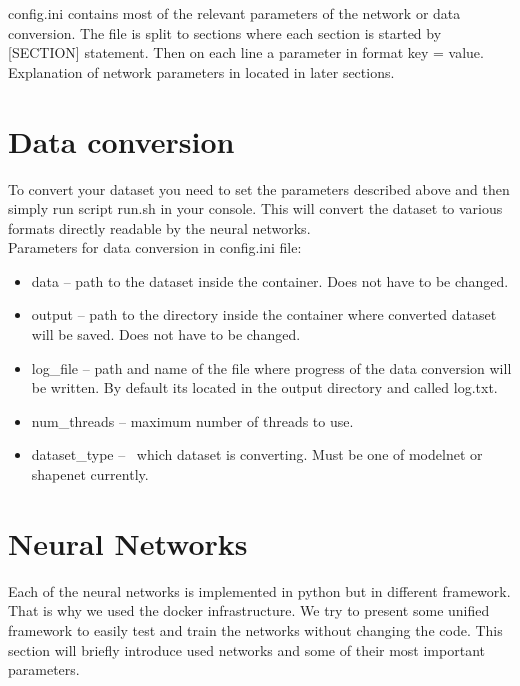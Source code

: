 config.ini contains most of the relevant parameters of the network or data conversion. The file is split to sections where each section is started by [SECTION] statement. Then on each line a parameter in format key = value. Explanation of network parameters in located in later sections.

\section{Data conversion}
To convert your dataset you need to set the parameters described above and then simply run script run.sh in your console. This will convert the dataset to various formats directly readable by the neural networks.\\
Parameters for data conversion in config.ini file:
\begin{itemize}
	\item  {data -- path to the dataset inside the container. Does not have to be changed.}
	\item{output -- path to the directory inside the container where converted dataset will be saved. Does not have to be changed.}
	\item{log\_file -- path and name of the file where progress of the data conversion will be written. By default its located in the output directory and called log.txt.}
	\item{num\_threads -- maximum number of threads to use.}
	\item{dataset\_type --  which dataset is converting. Must be one of modelnet or shapenet currently.}
\end{itemize}

\section{Neural Networks}
Each of the neural networks is implemented in python but in different framework. That is why we used the docker infrastructure. We try to present some unified framework to easily test and train the networks without changing the code. This section will briefly introduce used networks and some of their most important parameters.\\

